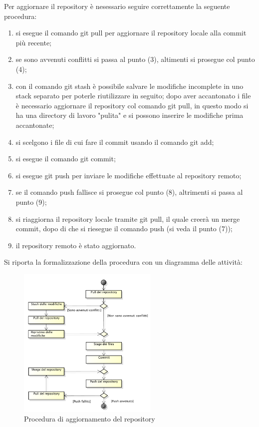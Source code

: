 				Per aggiornare il repository è nesessario seguire correttamente la seguente procedura:
				\begin{enumerate}
					\item si esegue il comando git pull per aggiornare il repository locale alla commit più recente;
					\item se sono avvenuti conflitti si passa al punto (3), altimenti si prosegue col punto (4);
					\item con il comando git stash è possibile salvare le modifiche incomplete in uno stack separato per poterle riutilizzare in seguito; dopo aver accantonato i file è necessario aggiornare il repository col comando git pull, in questo modo si ha una directory di lavoro "pulita" e si possono inserire le modifiche prima accantonate;
					\item si scelgono i file di cui fare il commit usando il comando git add;
					\item si esegue il comando git commit;
					\item si esegue git push per inviare le modifiche effettuate al repository remoto;
					\item se il comando push fallisce si prosegue col punto (8), altrimenti si passa al punto (9);
					\item si riaggiorna il repository locale tramite git pull, il quale creerà un merge commit, dopo di che si riesegue il comando push (si veda il punto (7));
					\item il repository remoto è stato aggiornato.
				\end{enumerate}
				Si riporta la formalizzazione della procedura con un diagramma delle attività:
				\begin{figure}[H]
					\centering
					\includegraphics[width=0.6\textwidth]{NormeDiProgetto/Pics/Commit}
					\caption{Procedura di aggiornamento del repository}
				\end{figure}
